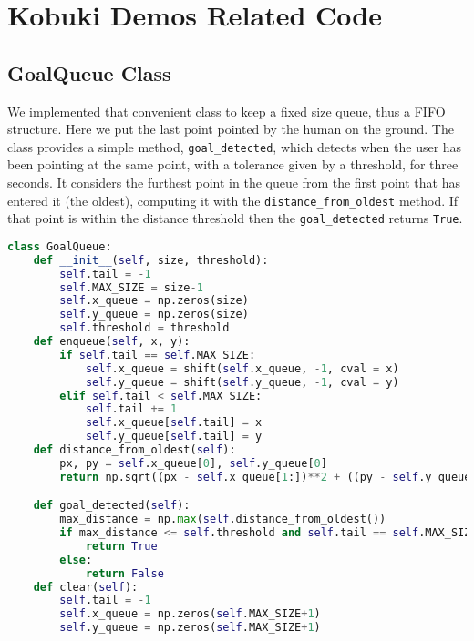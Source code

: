 \section*{Kobuki Demos Related Code}
\subsection*{GoalQueue Class}
We implemented that convenient class to keep a fixed size queue, thus a \ac{FIFO} structure. Here we put the last point pointed by the human on the ground. The class provides a simple method, \texttt{goal\_detected}, which detects when the user has been pointing at the same point, with a tolerance given by a threshold, for three seconds. It considers the furthest point in the queue from the first point that has entered it (the oldest), computing it with the \texttt{distance\_from\_oldest} method. If that point is within the distance threshold then the \texttt{goal\_detected} returns \texttt{True}.
\begin{lstlisting}[caption={Goal Queue Class},label={lst:goalqueue},language=Python]
class GoalQueue:
    def __init__(self, size, threshold):
        self.tail = -1
        self.MAX_SIZE = size-1
        self.x_queue = np.zeros(size)
        self.y_queue = np.zeros(size)
        self.threshold = threshold
    def enqueue(self, x, y):
        if self.tail == self.MAX_SIZE:
            self.x_queue = shift(self.x_queue, -1, cval = x)
            self.y_queue = shift(self.y_queue, -1, cval = y)
        elif self.tail < self.MAX_SIZE:
            self.tail += 1
            self.x_queue[self.tail] = x
            self.y_queue[self.tail] = y
    def distance_from_oldest(self):
        px, py = self.x_queue[0], self.y_queue[0]
        return np.sqrt((px - self.x_queue[1:])**2 + ((py - self.y_queue[1:]))**2)

    def goal_detected(self):
        max_distance = np.max(self.distance_from_oldest())
        if max_distance <= self.threshold and self.tail == self.MAX_SIZE:
            return True
        else:
            return False
    def clear(self):
        self.tail = -1
        self.x_queue = np.zeros(self.MAX_SIZE+1)
        self.y_queue = np.zeros(self.MAX_SIZE+1)
\end{lstlisting}

